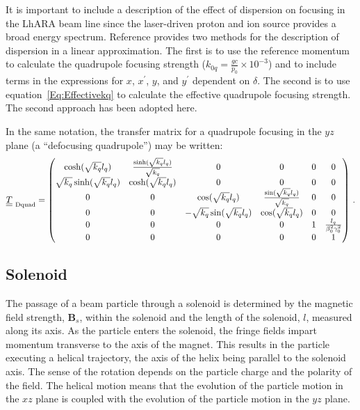It is important to include a description of the effect of dispersion
on focusing in the LhARA beam line since the laser-driven proton and
ion source provides a broad energy spectrum.
Reference \cite{Wolski:2014} provides two methods for the description of
dispersion in a linear approximation.
The first is to use the reference momentum to calculate the quadrupole
focusing strength ($k_{0q} = \frac{gc}{p_0} \times 10^{-3}$) and to
include terms in the expressions for $x$, $x^\prime$, $y$, and
$y^\prime$ dependent on $\delta$.
The second is to use equation~\ref{Eq:Effectivekq} to calculate the
effective quadrupole focusing strength.
The second approach has been adopted here.

In the same notation, the transfer matrix for a quadrupole focusing in
the $yz$ plane (a ``defocusing quadrupole'') may be written: 
\begin{equation}
  \underline{\underline{T}}_{\rm~Dquad} =
    \begin{pmatrix}
          \cosh(\sqrt{k_q} l_q) & \frac{\sinh(\sqrt{k_q} l_q)}{\sqrt{k_q}} & 0 & 0             & 0 & 0 \\
 \sqrt{k_q} \sinh(\sqrt{k_q} l_q) &                  \cosh(\sqrt{k_q} l_q) & 0 & 0             & 0 & 0 \\
          0 & 0 &            \cos(\sqrt{k_q} l_q) &  \frac{\sin(\sqrt{k_q} l_q)}{\sqrt{k_q}} & 0 & 0 \\
          0 & 0 &  -\sqrt{k_q} \sin(\sqrt{k_q} l_q) &                   \cos(\sqrt{k_q} l_q) & 0 & 0 \\
          0 & 0 & 0 & 0 & 1 & \frac{l_q}{\beta_0^2 \gamma_0^2} \\
          0 & 0 & 0 & 0 & 0 &                             1
        \end{pmatrix} \, .
\end{equation}

\subsection{Solenoid}

The passage of a beam particle through a solenoid is determined by
the magnetic field strength, $\bm{B}_s$, within the solenoid and the
length of the solenoid, $l$, measured along its axis.
As the particle enters the solenoid, the fringe fields impart momentum
transverse to the axis of the magnet.
This results in the particle executing a helical trajectory, the axis
of the helix being parallel to the solenoid axis.
The sense of the rotation depends on the particle charge and the
polarity of the field.
The helical motion means that the evolution of the particle motion in
the $xz$ plane is coupled with the evolution of the particle motion in
the $yz$ plane.

